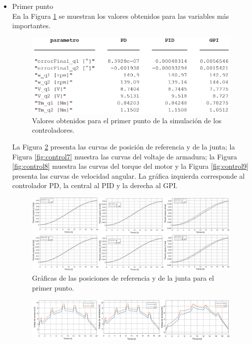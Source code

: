 \begin{itemize}
    \item Primer punto\\
    En la Figura \ref{fig:control5} se muestran los valores obtenidos para las variables más importantes.
    \begin{figure}[H]
    	\centering
    	\includegraphics[width=11cm]{imagenes/control5}
    	\caption{Valores obtenidos para el primer punto de la simulación de los controladores.}
    	\label{fig:control5}
    \end{figure}
    La Figura \ref{fig:control6} presenta las curvas de posición de referencia y de la junta; la Figura \ref{fig:control7} muestra las curvas del voltaje de armadura; la Figura \ref{fig:control8} muestra las curvas del torque del motor y la Figura \ref{fig:control9} presenta las curvas de velocidad angular. La gráfica izquierda corresponde al controlador PD, la central al PID y la derecha al GPI.
    \begin{figure}[H]
    	\centering
    	\includegraphics[width=\columnwidth]{imagenes/control6}
    	\caption{Gráficas de las posiciones de referencia y de la junta para el primer punto.}
    	\label{fig:control6}
    \end{figure}
    \begin{figure}[H]
    	\centering
    	\includegraphics[width=\columnwidth]{imagenes/control7}

\end{figure}
\end{itemize}
